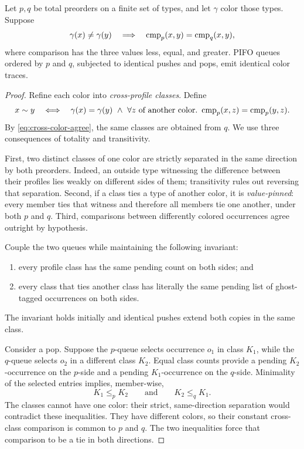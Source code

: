 \begin{lemma}
\label{lem:colored}
Let \(p,q\) be total preorders on a finite set of types, and let
\(\gamma\) color those types.  Suppose
\begin{equation}
 \gamma(x)\ne\gamma(y)
 \quad\Longrightarrow\quad
 \operatorname{cmp}_p(x,y)=\operatorname{cmp}_q(x,y),
 \label{eq:cross-color-agree}
\end{equation}
where comparison has the three values less, equal, and greater.  PIFO queues
ordered by \(p\) and \(q\), subjected to identical pushes and pops, emit
identical color traces.
\end{lemma}

\begin{proof}
Refine each color into \emph{cross-profile classes}.  Define
\begin{equation}
 x\sim y
 \quad\Longleftrightarrow\quad
 \gamma(x)=\gamma(y)
 \ \land\ 
 \forall z\text{ of another color}.\ 
   \cmp_p(x,z)=\cmp_p(y,z).
 \label{eq:profile-class}
\end{equation}
By \autoref{eq:cross-color-agree}, the same classes are obtained from \(q\).
We use three consequences of totality and transitivity.

First, two distinct classes of one color are strictly separated in the same
direction by both preorders.  Indeed, an outside type witnessing the difference
between their profiles lies weakly on different sides of them; transitivity
rules out reversing that separation.  Second, if a class ties a type of another
color, it is \emph{value-pinned}: every member ties that witness and therefore
all members tie one another, under both \(p\) and \(q\).  Third, comparisons
between differently colored occurrences agree outright by hypothesis.

Couple the two queues while maintaining the following invariant:
\begin{enumerate}
\item every profile class has the same pending count on both sides; and
\item every class that ties another class has literally the same pending list
      of ghost-tagged occurrences on both sides.
\end{enumerate}
The invariant holds initially and identical pushes extend both copies in the
same class.

Consider a pop.  Suppose the \(p\)-queue selects occurrence \(o_1\) in class
\(K_1\), while the \(q\)-queue selects \(o_2\) in a different class \(K_2\).
Equal class counts provide a pending \(K_2\)-occurrence on the \(p\)-side and a
pending \(K_1\)-occurrence on the \(q\)-side.  Minimality of the selected
entries implies, member-wise,
\[
  K_1\le_p K_2
  \qquad\text{and}\qquad
  K_2\le_q K_1.
\]
The classes cannot have one color: their strict, same-direction separation
would contradict these inequalities.  They have different colors, so their
constant cross-class comparison is common to \(p\) and \(q\).  The two
inequalities force that comparison to be a tie in both directions.


\end{proof}
